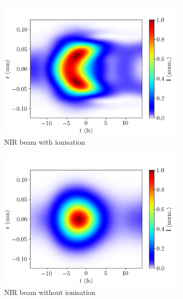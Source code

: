 \documentclass[a4paper]{jpconf}
\begin{document}
\begin{figure}[h]
\centering
 \begin{subfigure}{0.49\textwidth}
        \includegraphics[width=\textwidth]{im/IR_pulse_output_Ar_ion}
    \caption{NIR beam with ionisation}
    \end{subfigure}
    \begin{subfigure}{0.49\textwidth}
        \includegraphics[width=\textwidth]{im/IR_pulse_output_Ar_no_ion}
    \caption{NIR beam without ionisation}
    \end{subfigure} 
    \begin{subfigure}{0.49\textwidth}

\end{subfigure}
\end{figure}
\end{document}
